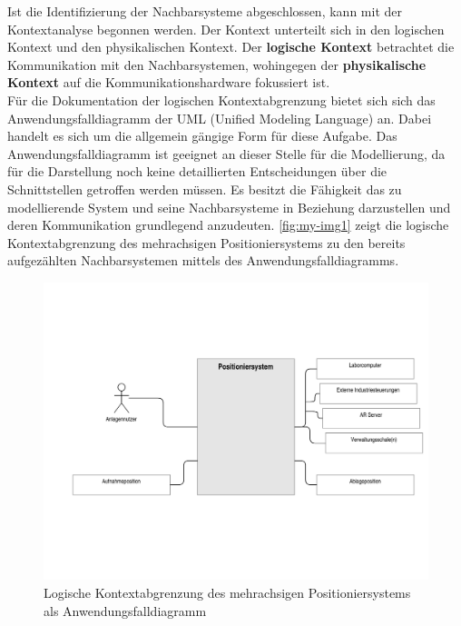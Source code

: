\documentclass[../Bachelorarbeit.tex]{subfiles}
\begin{document}
Ist die Identifizierung der Nachbarsysteme abgeschlossen, kann mit der Kontextanalyse begonnen werden. Der Kontext unterteilt sich in den logischen Kontext und den physikalischen Kontext. Der \textbf{logische Kontext} betrachtet die Kommunikation mit den Nachbarsystemen, wohingegen der \textbf{physikalische Kontext} auf die Kommunikationshardware fokussiert ist.\\ %
Für die Dokumentation der logischen Kontextabgrenzung bietet sich sich das Anwendungsfalldiagramm der UML (Unified Modeling Language) an. Dabei handelt es sich um die allgemein gängige Form für diese Aufgabe. Das Anwendungsfalldiagramm ist geeignet an dieser Stelle für die Modellierung, da für die Darstellung noch keine detaillierten Entscheidungen über die Schnittstellen getroffen werden müssen. Es besitzt die Fähigkeit das zu modellierende System und seine Nachbarsysteme in Beziehung darzustellen und deren Kommunikation grundlegend anzudeuten. \autoref{fig:my-img1} zeigt die logische Kontextabgrenzung des mehrachsigen Positioniersystems zu den bereits aufgezählten Nachbarsystemen mittels des Anwendungsfalldiagramms.

\begin{figure}[h]
    \centering
    \includegraphics[width=\textwidth]{Images/kontextana.pdf}
    \caption[Logische Kontextabgrenzung]{Logische Kontextabgrenzung des mehrachsigen Positioniersystems als Anwendungsfalldiagramm}
    \label{fig:my-img1}
\end{figure}
\end{document}
